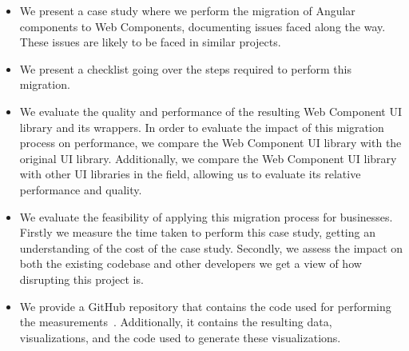 \begin{itemize}
	\item We present a case study where we perform the migration of Angular components to Web Components, documenting issues faced along the way. These issues are likely to be faced in similar projects.
	\item We present a checklist going over the steps required to perform this migration.
	\item We evaluate the quality and performance of the resulting Web Component UI library and its wrappers. In order to evaluate the impact of this migration process on performance, we compare the Web Component UI library with the original UI library. Additionally, we compare the Web Component UI library with other UI libraries in the field, allowing us to evaluate its relative performance and quality.
	\item We evaluate the feasibility of applying this migration process for businesses. Firstly we measure the time taken to perform this case study, getting an understanding of the cost of the case study. Secondly, we assess the impact on both the existing codebase and other developers we get a view of how disrupting this project is.
	\item We provide a GitHub repository that contains the code used for performing the measurements~. Additionally, it contains the resulting data, visualizations, and the code used to generate these visualizations.
\end{itemize}